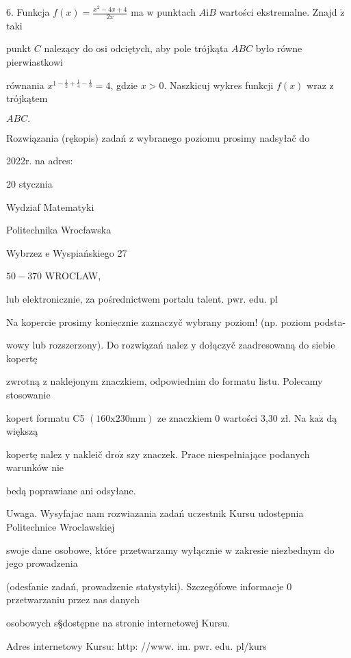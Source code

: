 \documentclass[a4paper,12pt]{article}
\begin{document}
6. Funkcja $f(x) = \displaystyle \frac{x^{2}-4x+4}{2x}$ ma $\mathrm{w}$ punktach $A\mathrm{i}B$ wartości ekstremalne. Znajd $\acute{\mathrm{z}}$ taki

punkt $C$ nalezący do osi odciętych, aby pole trójkąta $ABC$ było równe pierwiastkowi

równania $x^{1-\frac{1}{2}+\frac{1}{4}-\frac{1}{8}} =4$, gdzie $x>0$. Naszkicuj wykres funkcji $f(x)$ wraz $\mathrm{z}$ trójkątem

$ABC.$

Rozwiązania (rękopis) zadań z wybranego poziomu prosimy nadsyłač do

2022r. na adres:

20 stycznia

Wydziaf Matematyki

Politechnika Wrocfawska

Wybrzez $\mathrm{e}$ Wyspiańskiego 27

$50-370$ WROCLAW,

lub elektronicznie, za pośrednictwem portalu talent. $\mathrm{p}\mathrm{w}\mathrm{r}$. edu. pl

Na kopercie prosimy $\underline{\mathrm{k}\mathrm{o}\mathrm{n}\mathrm{i}\mathrm{e}\mathrm{c}\mathrm{z}\mathrm{n}\mathrm{i}\mathrm{e}}$ zaznaczyč wybrany poziom! (np. poziom podsta-

wowy lub rozszerzony). Do rozwiązań nalez $\mathrm{y}$ dołączyč zaadresowaną do siebie kopertę

zwrotną $\mathrm{z}$ naklejonym znaczkiem, odpowiednim do formatu listu. Polecamy stosowanie

kopert formatu C5 $(160\mathrm{x}230\mathrm{m}\mathrm{m})$ ze znaczkiem $0$ wartości 3,30 zł. Na $\mathrm{k}\mathrm{a}\dot{\mathrm{z}}$ dą większą

kopertę nalez $\mathrm{y}$ nakleič $\mathrm{d}\mathrm{r}\mathrm{o}\dot{\mathrm{z}}$ szy znaczek. Prace niespełniające podanych warunków nie

bedą poprawiane ani odsyłane.

Uwaga. Wysyfajac nam rozwiazania zadań uczestnik Kursu udostępnia Politechnice Wroclawskiej

swoje dane osobowe, które przetwarzamy wyłącznie $\mathrm{w}$ zakresie niezbednym do jego prowadzenia

(odesfanie zadań, prowadzenie statystyki). Szczegófowe informacje $0$ przetwarzaniu przez nas danych

osobowych s\S dostępne na stronie internetowej Kursu.

Adres internetowy Kursu: http: //www. im. pwr. edu. pl/kurs
\end{document}
